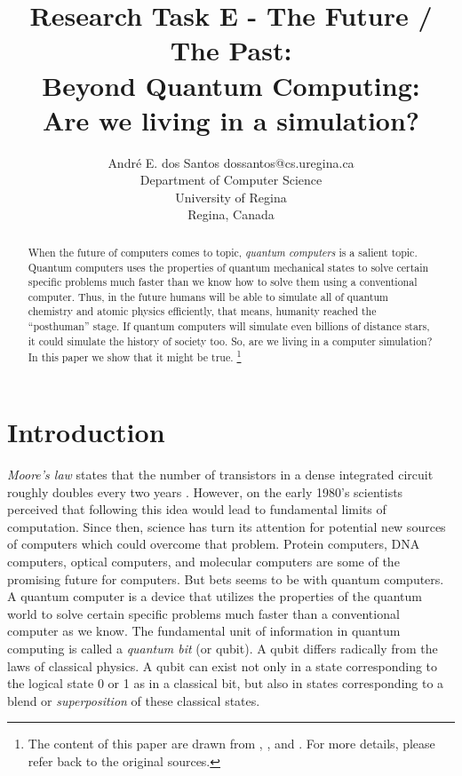 \documentclass[twoside,11pt]{article}
\begin{document}
\title{Research Task E - The Future / The Past: \\ Beyond Quantum Computing: \\Are we living in a simulation?}

\author{\name André E. dos Santos \email dossantos@cs.uregina.ca \\
\addr Department of Computer Science \\
University of Regina \\ 
Regina, Canada
}



\maketitle

\begin{abstract}%
When the future of computers comes to topic, \emph{quantum computers} is a salient topic.
Quantum computers uses the properties of quantum mechanical states to solve certain specific problems much faster than we know how to solve them using a conventional computer.
Thus, in the future humans will be able to simulate all of quantum chemistry and atomic physics efficiently, that means, humanity reached the ``posthuman'' stage.
If quantum computers will simulate even billions of distance stars, it could simulate the history of society too.
So, are we living in a computer simulation?
In this paper we show that it might be true.
\footnote{
The content of this paper are drawn from \citep{thedg}, \citep{scott16}, and \citep{bostrom2003we}.
For more details, please refer back to the original sources.
}
\end{abstract}


\section{Introduction}
\label{sec:intro}



\emph{Moore's law} states that the number of transistors in a dense integrated circuit roughly doubles every two years \citep{schaller1997moore}.
However, on the early 1980's scientists perceived that following this idea would lead to fundamental limits of computation.
Since then, science has turn its attention for potential new sources of computers which could overcome that problem.
Protein computers, DNA computers, optical computers, and molecular computers are some of the promising future for computers.
But bets seems to be with quantum computers.
A quantum computer is a device that utilizes the properties of the quantum world to solve certain specific problems much faster than a conventional computer as we know.
The fundamental unit of information in quantum computing is called a \emph{quantum bit} (or qubit).
A qubit differs radically from the laws of classical physics.
A qubit can exist not only in a state corresponding to the logical state 0 or 1 as in a classical bit, but also in states corresponding to a blend or \emph{superposition} of these classical states.
\end{document}
